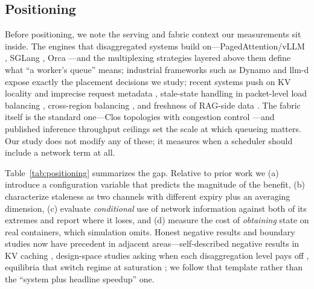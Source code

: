 \subsection{Positioning}
Before positioning, we note the serving and fabric context our measurements sit inside. The
engines that disaggregated systems build on---PagedAttention/vLLM \cite{vllm}, SGLang
\cite{sglang}, Orca \cite{orca}---and the multiplexing strategies layered above them
\cite{alpaserve} define what ``a worker's queue'' means; industrial frameworks such as Dynamo
\cite{dynamo} and llm-d \cite{llmd} expose exactly the placement decisions we study; recent
systems push on KV locality and imprecise request metadata \cite{jitserve}, stale-state
handling in packet-level load balancing \cite{psp}, cross-region balancing \cite{gorgo}, and
freshness of RAG-side data \cite{churnbench}. The fabric itself is the standard one---Clos
topologies \cite{fattree} with congestion control \cite{dctcp,dcqcn,hpcc}---and published
inference throughput ceilings \cite{mlperf} set the scale at which queueing matters. Our study
does not modify any of these; it measures when a scheduler should include a network term at all.

Table~\ref{tab:positioning} summarizes the gap. Relative to prior work we (a) introduce a
configuration variable that predicts the magnitude of the benefit, (b) characterize staleness as
two channels with different expiry plus an averaging dimension, (c) evaluate \emph{conditional}
use of network information against both of its extremes and report where it loses, and (d)
measure the cost of \emph{obtaining} state on real containers, which simulation omits. Honest
negative results and boundary studies now have precedent in adjacent areas---self-described
negative results in KV caching \cite{elastickv}, design-space studies asking when each
disaggregation level pays off \cite{howfar}, equilibria that switch regime at saturation
\cite{poa}; we follow that template rather than the ``system plus headline speedup'' one.

